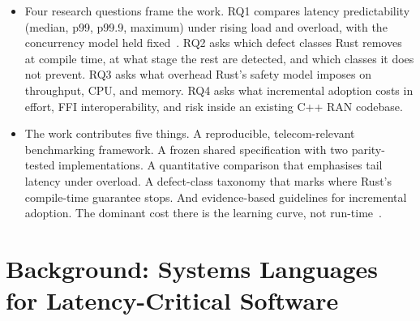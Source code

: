\documentclass[english,twoside,openright,a4paper,censored,csm,software-track-2020]{HYthesisML}
\begin{document}
\begin{itemize}
        peer-reviewed position argues for making memory-error sanitisation practical, not for
        replacing it with a compile-time guarantee~\cite{gjomemo2016mesc}. That is the
        strategy this thesis tests against.
  \item Four research questions frame the work. RQ1 compares latency predictability (median,
        p99, p99.9, maximum) under rising load and overload, with the concurrency model held
        fixed~\cite{dean2013tail}. RQ2 asks which defect classes Rust removes at compile time,
        at what stage the rest are detected, and which classes it does not prevent. RQ3 asks
        what overhead Rust's safety model imposes on throughput, CPU, and memory. RQ4 asks what
        incremental adoption costs in effort, FFI interoperability, and risk inside an existing
        C++ RAN codebase.
  \item The work contributes five things. A reproducible, telecom-relevant benchmarking
        framework. A frozen shared specification with two parity-tested implementations. A
        quantitative comparison that emphasises tail latency under overload. A defect-class
        taxonomy that marks where Rust's compile-time guarantee stops. And evidence-based
        guidelines for incremental adoption. The dominant cost there is the learning curve, not
        run-time~\cite{fulton2021adopting}.
\end{itemize}

\chapter{Background: Systems Languages for Latency-Critical Software\label{chapter:background}}
\end{document}
